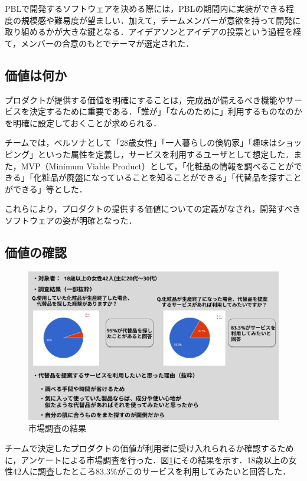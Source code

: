 \documentclass[fontsize=9pt, jafontscale=.95, twocolumn, a4paper]{jlreq}
\begin{document}
PBLで開発するソフトウェアを決める際には，PBLの期間内に実装ができる程度の規模感や難易度が望ましい．加えて，チームメンバーが意欲を持って開発に取り組めるかが大きな鍵となる．アイデアソンとアイデアの投票という過程を経て，メンバーの合意のもとでテーマが選定された．

\subsection{価値は何か}
\label{sec:orgb96f597}
プロダクトが提供する価値を明確にすることは，完成品が備えるべき機能やサービスを決定するために重要である．「誰が」「なんのために」利用するものなのかを明確に設定しておくことが求められる．

チームでは，ペルソナとして「28歳女性」「一人暮らしの倹約家」「趣味はショッピング」といった属性を定義し，サービスを利用するユーザとして想定した．また，MVP（Minimum Viable Product）として，「化粧品の情報を調べることができる」「化粧品が廃盤になっていることを知ることができる」「代替品を探すことができる」等とした．

これらにより，プロダクトの提供する価値についての定義がなされ，開発すべきソフトウェアの姿が明確となった．

\subsection{価値の確認}
\label{sec:orgfc0adef}

\begin{figure}[tb]
\centering
\includegraphics[width=.9\linewidth]{./images/marketing.png}
\caption{\label{fig:orgad24bd8}市場調査の結果}
\end{figure}

チームで決定したプロダクトの価値が利用者に受け入れられるか確認するために，アンケートによる市場調査を行った．図\ref{fig:orgad24bd8}にその結果を示す．18歳以上の女性42人に調査したところ83.3\%がこのサービスを利用してみたいと回答した．
\end{document}
